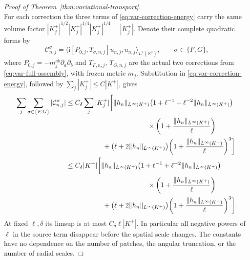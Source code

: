 \documentclass[11pt,a4paper]{article}
\numberwithin{equation}{section}
\newcommand{\R}{\mathbb R}
\newcommand{\f}[2]{\frac{#1}{#2}}
\newcommand{\ii}{\mathrm{i}}
\theoremstyle{definition}
\begin{document}
\begin{proof}[Proof of Theorem~\ref{thm:variational-transport}]
\begin{equation*}
\end{equation*}
For each correction the three terms of
\eqref{eq:var-correction-energy} carry the same volume factor
$|K_j^+|^{1/2}|K_j^+|^{1/4}|K_j^+|^{1/4}=|K_j^+|$.
Denote their complete quadratic forms by
\begin{equation*}
\mathcal C_{n,j}^{\sigma}
 =\bigl\langle
 \ii[P_{0,j},T_{\sigma,n,j}]u_{n,j},u_{n,j}\bigr\rangle_{L^2(\R^4)},
\qquad \sigma\in\{F,G\},
\end{equation*}
where $P_{0,j}=-m_j^{ab}\partial_a\partial_b$ and
$T_{F,n,j}$, $T_{G,n,j}$ are the actual two corrections from
\eqref{eq:var-full-assembly}, with frozen metric $m_j$.
Substitution in \eqref{eq:var-correction-energy}, followed by
$\sum_j|K_j^+|\leq C|K^+|$, gives
\begin{equation*}
\begin{aligned}
\sum_j\sum_{\sigma\in\{F,G\}}|\mathcal C_{n,j}^{\sigma}|
&\leq C_\delta\sum_j|K_j^+|
 \bigg[\|h_n\|_{L^\infty(K^+)}
 \bigl(1+\ell^{-1}+\ell^{-2}\|h_n\|_{L^\infty(K^+)}\bigr)\\
&\hspace{42mm}\times
 \bigg(1+\f{\|h_n\|_{L^\infty(K^+)}}\ell\bigg)\\
&\hspace{19mm}
 +\bigl(\ell+2\|h_n\|_{L^\infty(K^+)}\bigr)
 \bigg(1+\f{\|h_n\|_{L^\infty(K^+)}}\ell\bigg)^3\bigg]\\
&\leq C_\delta|K^+|
 \bigg[\|h_n\|_{L^\infty(K^+)}
 \bigl(1+\ell^{-1}+\ell^{-2}\|h_n\|_{L^\infty(K^+)}\bigr)\\
&\hspace{42mm}\times
 \bigg(1+\f{\|h_n\|_{L^\infty(K^+)}}\ell\bigg)\\
&\hspace{19mm}
 +\bigl(\ell+2\|h_n\|_{L^\infty(K^+)}\bigr)
 \bigg(1+\f{\|h_n\|_{L^\infty(K^+)}}\ell\bigg)^3\bigg].
\end{aligned}
\end{equation*}
At fixed $\ell,\delta$ its limsup is at most
$C_\delta\ell|K^+|$. In particular all negative powers of $\ell$
in the source term disappear before the spatial scale changes.
The constants have no dependence on the number of patches, the
angular truncation, or the number of radial scales.


\end{proof}
\end{document}
